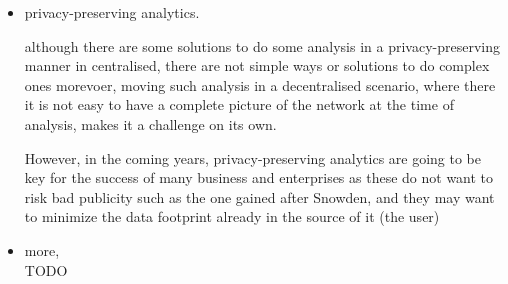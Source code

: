\begin{itemize}[topsep=\parskip, parsep=\parskip, itemsep=\parskip]
    Although our focus in this work has been on decentralisation of centralised 
    \acp{is}, such as those where there can be various actors --- for example, in 
    \acp{osn}, there are also other scenarios where decentralisation could be of 
    interest
    
    For example, in home care --- where a nurse carries some sensitive \ac{pii} 
    in order to provide the right care to a patient and eventually returns to the 
    primary care facility with some new personal data about that patient, in 
    content-sharing or even in public ledging of transactions without a \ac{ttp} 
    --- such as those happening in the blockchain powering the crypto-currency \Bitcoin.
    
    \item privacy-preserving analytics.
    
    although there are some solutions to do some analysis in a privacy-preserving 
    manner in centralised, there are not simple ways or solutions to do complex ones
    morevoer, moving such analysis in a decentralised scenario, where there it is 
    not easy to have a complete picture of the network at the time of analysis, makes
    it a challenge on its own.
    
    However, in the coming years, privacy-preserving analytics are going to be key 
    for the success of many business and enterprises as these do not want to risk 
    bad publicity such as the one gained after Snowden, and they may want to minimize 
    the data footprint already in the source of it (the user)
    
    \item more,\\
    TODO

\end{itemize}


